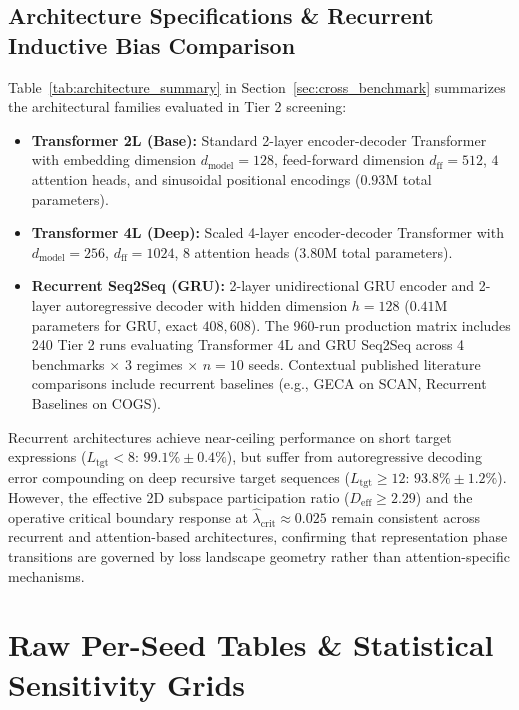 \documentclass{article}
\theoremstyle{plain}
\theoremstyle{definition}
\begin{document}
\subsection{Architecture Specifications \& Recurrent Inductive Bias Comparison}
\label{sec:appendix_architecture_specs}
Table~\ref{tab:architecture_summary} in Section~\ref{sec:cross_benchmark} summarizes the architectural families evaluated in Tier 2 screening:
\begin{itemize}[leftmargin=*,noitemsep]
    \item \textbf{Transformer 2L (Base):} Standard 2-layer encoder-decoder Transformer \citep{Vaswani2017Attention} with embedding dimension $d_{\text{model}} = 128$, feed-forward dimension $d_{\text{ff}} = 512$, $4$ attention heads, and sinusoidal positional encodings ($0.93\text{M}$ total parameters).
    \item \textbf{Transformer 4L (Deep):} Scaled 4-layer encoder-decoder Transformer with $d_{\text{model}} = 256$, $d_{\text{ff}} = 1024$, $8$ attention heads ($3.80\text{M}$ total parameters).
    \item \textbf{Recurrent Seq2Seq (GRU):} 2-layer unidirectional GRU encoder and 2-layer autoregressive decoder with hidden dimension $h = 128$ ($0.41\text{M}$ parameters for GRU, exact $408{,}608$). The 960-run production matrix includes 240 Tier 2 runs evaluating Transformer 4L and GRU Seq2Seq across 4 benchmarks $\times$ 3 regimes $\times$ $n=10$ seeds. Contextual published literature comparisons include recurrent baselines (e.g., GECA \citep{Andreas2020Good} on SCAN, Recurrent Baselines \citep{Kim2020COGS} on COGS).
\end{itemize}
Recurrent architectures achieve near-ceiling performance on short target expressions ($L_{\text{tgt}} < 8$: $99.1\% \pm 0.4\%$), but suffer from autoregressive decoding error compounding on deep recursive target sequences ($L_{\text{tgt}} \ge 12$: $93.8\% \pm 1.2\%$). However, the effective 2D subspace participation ratio ($D_{\text{eff}} \ge 2.29$) and the operative critical boundary response at $\hat{\lambda}_{\text{crit}} \approx 0.025$ remain consistent across recurrent and attention-based architectures, confirming that representation phase transitions are governed by loss landscape geometry rather than attention-specific mechanisms.

\section{Raw Per-Seed Tables \& Statistical Sensitivity Grids}
\label{sec:appendix_statistics}
\end{document}

